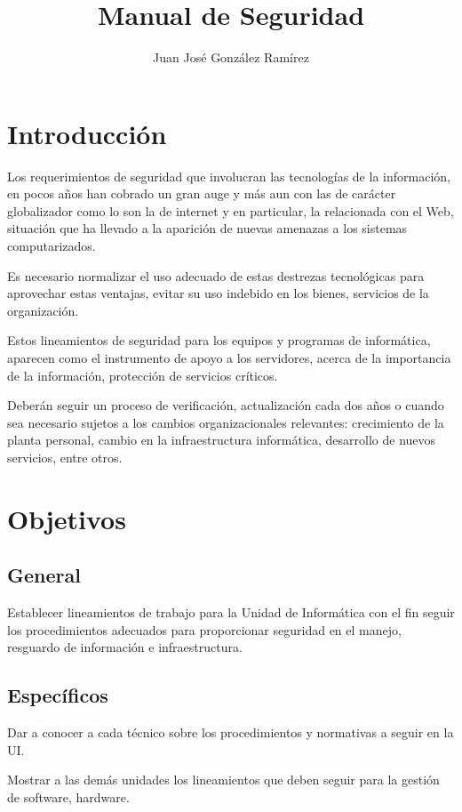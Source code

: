 \documentclass{book}
\title{Manual de Seguridad}
\author{Juan José González Ramírez}
\begin{document}
    \maketitle
    \tableofcontents
    \chapter{Introducción}
        Los requerimientos de seguridad que involucran las tecnologías de la
        información, en pocos años han cobrado un gran auge y más aun con las de carácter
        globalizador como lo son la de internet y en particular, la relacionada con el Web,
        situación que ha llevado a la aparición de nuevas amenazas a los sistemas
        computarizados.

        Es necesario normalizar el uso adecuado de estas destrezas tecnológicas para
        aprovechar estas ventajas, evitar su uso indebido en los bienes, servicios
        de la organización.

        Estos lineamientos de seguridad para los equipos y programas
        de informática, aparecen como el instrumento de apoyo a los servidores, acerca de la
        importancia de la información, protección de servicios críticos.

        Deberán seguir un proceso de verificación, actualización cada dos
        años o cuando sea necesario sujetos a los cambios organizacionales relevantes:
        crecimiento de la planta personal, cambio en la infraestructura informática, desarrollo
        de nuevos servicios, entre otros.
    \
    \chapter{Objetivos}
        \section{General}
            Establecer lineamientos de trabajo para la Unidad de Informática con el fin
            seguir los procedimientos adecuados para proporcionar seguridad en el manejo,
            resguardo de información e infraestructura.
        \
        \section{Específicos}
            Dar a conocer a cada técnico sobre los procedimientos y normativas a seguir en
            la UI.

            Mostrar a las demás unidades los lineamientos que deben seguir
            para la gestión de software, hardware.
        \
\end{document}
